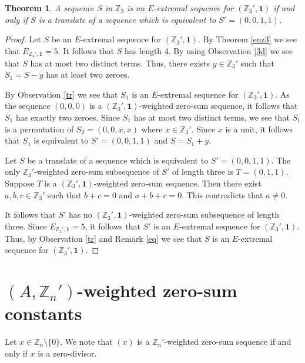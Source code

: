 \documentclass{article}[11pt]
\newtheorem{theorem}{Theorem}[section]
\theoremstyle{definition}
\begin{document}
\begin{theorem}
A sequence $S$ in $\mathbb Z_3$ is an $E$-extremal sequence for $(\mathbb Z_3',\mathbf 1)$ if and only if $S$ is a translate of a sequence which is equivalent to $S'=(0,0,1,1)$.
\end{theorem}

\begin{proof}
Let $S$ be an $E$-extremal sequence for $(\mathbb Z_3',\mathbf 1)$. By Theorem \ref{enz3} we see that $E_{\mathbb Z_3',\mathbf 1}=5$. It follows that $S$ has length 4. By using Observation \ref{3d} we see that $S$ has at most two distinct terms. Thus, there exists $y\in \mathbb Z_3'$ such that $S_1=S-y$ has at least two zeroes.

By Observation \ref{tr} we see that $S_1$ is an $E$-extremal sequence for $(\mathbb Z_3',\mathbf 1)$. As the sequence $(0,0,0)$ is a $(\mathbb Z_3',\mathbf 1)$-weighted zero-sum sequence, it follows that $S_1$ has exactly two zeroes. Since $S_1$ has at most two distinct terms, we see that $S_1$ is a permutation of $S_2=(0,0,x,x)$ where $x\in\mathbb Z_3'$. Since $x$ is a unit, it follows that $S_1$ is equivalent to $S'=(0,0,1,1)$ and $S=S_1+y$.

Let $S$ be a translate of a sequence which is equivalent to $S'=(0,0,1,1)$. The only $\mathbb Z_3'$-weighted zero-sum subsequence of $S'$ of length three is $T=(0,1,1)$. Suppose $T$ is a $(\mathbb Z_3',\mathbf 1)$-weighted zero-sum sequence. Then there exist $a,b,c\in \mathbb Z_3'$ such that $b+c=0$ and $a+b+c=0$. This contradicts that $a\neq 0$.

It follows that $S'$ has no $(\mathbb Z_3',\mathbf 1)$-weighted zero-sum subsequence of length three. Since $E_{\mathbb Z_3',\mathbf 1}=5$, it follows that $S'$ is an $E$-extremal sequence for $(\mathbb Z_3',\mathbf 1)$. Thus, by Observation \ref{tr} and Remark \ref{eq} we see that $S$ is an $E$-extremal sequence for $(\mathbb Z_3',\mathbf 1)$.
\end{proof}






\section{$(A,\mathbb Z_n')$-weighted zero-sum constants}

Let $x\in \mathbb Z_n\setminus \{0\}$. We note that $(x)$ is a $\mathbb Z_n'$-weighted zero-sum sequence if and only if $x$ is a zero-divisor.
\end{document}
